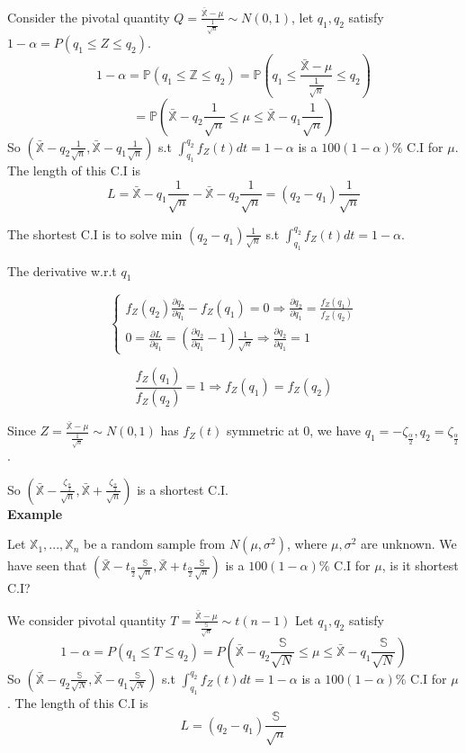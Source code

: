 Consider the pivotal quantity $Q = \frac{\bar{\mathbb{X}}-\mu}{\frac{1}{\sqrt{n}}} \sim N(0, 1)$, let $q_1, q_2$ satisfy $1-\alpha = P(q_1 \leq Z \leq q_2)$.
$$1-\alpha = \mathbb{P}(q_1 \leq \mathbb{Z} \leq q_2) = \mathbb{P}(q_1\leq \frac{\bar{\mathbb{X}}-\mu}{\frac{1}{\sqrt{n}}} \leq q_2)$$
$$= \mathbb{P}(\bar{\mathbb{X}}-q_2\frac{1}{\sqrt{n}} \leq \mu \leq \bar{\mathbb{X}}-q_1\frac{1}{\sqrt{n}} )$$
So $(\bar{\mathbb{X}}-q_2\frac{1}{\sqrt{n}} , \bar{\mathbb{X}}-q_1\frac{1}{\sqrt{n}})$ s.t $\int_{q_1}^{q_2}f_Z(t)dt = 1-\alpha$ is a $100(1-\alpha)\%$ C.I for $\mu$. The length of this C.I is $$L = \bar{\mathbb{X}}-q_1\frac{1}{\sqrt{n}} - \bar{\mathbb{X}}-q_2\frac{1}{\sqrt{n}} = (q_2 - q_1)\frac{1}{\sqrt{n}}$$

The shortest C.I is to solve min $(q_2 - q_1)\frac{1}{\sqrt{n}}$ s.t $\int_{q_1}^{q_2}f_Z(t)dt = 1-\alpha$.

The derivative w.r.t $q_1$

$$\begin{cases}
f_Z(q_2)\frac{\partial q_2}{\partial q_1} - f_Z(q_1) = 0 \Rightarrow \frac{\partial q_2}{\partial q_1} = \frac{f_Z(q_1)}{f_Z(q_2)} \\
0 = \frac{\partial L}{\partial q_1} = (\frac{\partial q_2}{\partial q_1} - 1)\frac{1}{\sqrt{n}} \Rightarrow \frac{\partial q_2}{\partial q_1} = 1
\end{cases}$$

$$\frac{f_Z(q_1)}{f_Z(q_2)} = 1 \Rightarrow f_Z(q_1) = f_Z(q_2)$$

Since $Z = \frac{\bar{\mathbb{X}}-\mu}{\frac{1}{\sqrt{n}}} \sim N(0, 1)$ has $f_Z(t)$ symmetric at 0, we have $q_1 = -\zeta_\frac{\alpha}{2}, q_2 = \zeta_\frac{\alpha}{2}$.

So $(\bar{\mathbb{X}}-\frac{\zeta_{\frac{\alpha}{2}}}{\sqrt{n}}, \bar{\mathbb{X}}+\frac{\zeta_{\frac{\alpha}{2}}}{\sqrt{n}})$  is a shortest C.I.\\


\textbf{Example}

Let $\mathbb{X}_1, ..., \mathbb{X}_n$ be a random sample from $N(\mu, \sigma^2)$, where $\mu, \sigma^2$ are unknown. We have seen that $(\bar{\mathbb{X}}-t_{\frac{\alpha}{2}}\frac{\mathbb{S}}{\sqrt{n}}, \bar{\mathbb{X}}+t_{\frac{\alpha}{2}}\frac{\mathbb{S}}{\sqrt{n}})$ is a $100(1-\alpha)\%$ C.I for $\mu$, is it shortest C.I?

We consider pivotal quantity $T = \frac{\bar{\mathbb{X}}-\mu}{\frac{\mathbb{S}}{\sqrt{n}}} \sim t(n-1)$
Let $q_1, q_2$ satisfy
$$1-\alpha = P(q_1 \leq T \leq q_2) = P(\bar{\mathbb{X}}-q_2\frac{\mathbb{S}}{\sqrt{N}} \leq \mu \leq \bar{\mathbb{X}}-q_1\frac{\mathbb{S}}{\sqrt{N}})$$
So $(\bar{\mathbb{X}}-q_2\frac{\mathbb{S}}{\sqrt{N}}, \bar{\mathbb{X}}-q_1\frac{\mathbb{S}}{\sqrt{N}})$ s.t $\int_{q_1}^{q_2}f_Z(t)dt = 1-\alpha$ is a $100(1-\alpha)\%$ C.I for $\mu$. The length of this C.I is 
$$L = (q_2 - q_1)\frac{\mathbb{S}}{\sqrt{n}}$$

